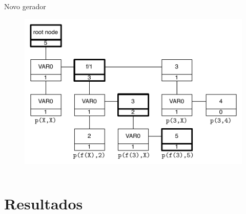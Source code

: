 \documentclass{beamer}
\begin{document}
\begin{frame}
\begin{columns}[t]
\begin{block}{Novo gerador}
\begin{figure}[ht]
               \includegraphics[scale=0.31]{in_eval_add.pdf}
           \end{figure}
         \end{block}

     \end{columns}
\end{frame}

\section{Resultados}
\end{document}
